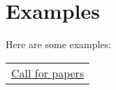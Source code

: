 

\ifweb
\appendix



\section{Examples}



Here are some examples:

\begin{tabular}{l}
  \href{../examples/cfpapers.html}{Call for papers}
\end{tabular}

\fi



